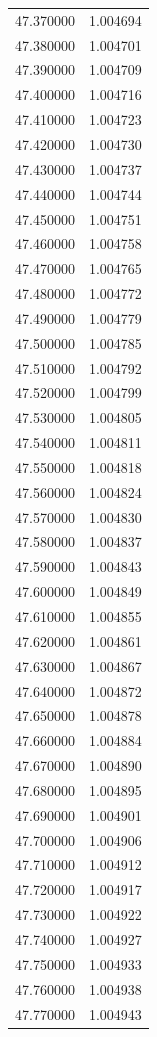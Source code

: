 \begin{tabular}{rr}
47.370000 & 1.004694 \\
47.380000 & 1.004701 \\
47.390000 & 1.004709 \\
47.400000 & 1.004716 \\
47.410000 & 1.004723 \\
47.420000 & 1.004730 \\
47.430000 & 1.004737 \\
47.440000 & 1.004744 \\
47.450000 & 1.004751 \\
47.460000 & 1.004758 \\
47.470000 & 1.004765 \\
47.480000 & 1.004772 \\
47.490000 & 1.004779 \\
47.500000 & 1.004785 \\
47.510000 & 1.004792 \\
47.520000 & 1.004799 \\
47.530000 & 1.004805 \\
47.540000 & 1.004811 \\
47.550000 & 1.004818 \\
47.560000 & 1.004824 \\
47.570000 & 1.004830 \\
47.580000 & 1.004837 \\
47.590000 & 1.004843 \\
47.600000 & 1.004849 \\
47.610000 & 1.004855 \\
47.620000 & 1.004861 \\
47.630000 & 1.004867 \\
47.640000 & 1.004872 \\
47.650000 & 1.004878 \\
47.660000 & 1.004884 \\
47.670000 & 1.004890 \\
47.680000 & 1.004895 \\
47.690000 & 1.004901 \\
47.700000 & 1.004906 \\
47.710000 & 1.004912 \\
47.720000 & 1.004917 \\
47.730000 & 1.004922 \\
47.740000 & 1.004927 \\
47.750000 & 1.004933 \\
47.760000 & 1.004938 \\
47.770000 & 1.004943 \\

\end{tabular}
